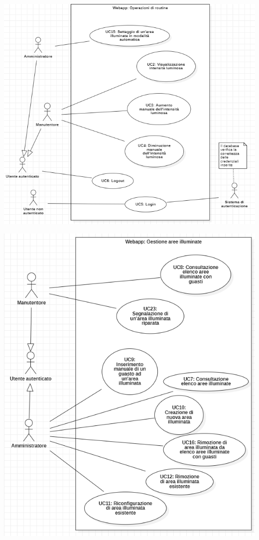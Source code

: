 \documentclass[a4paper, 12pt]{article}
\begin{document}
\includegraphics[scale=0.7]{diagramma_use_case_2.png}

\includegraphics[scale=0.7]{diagramma_use_case_3.png}
\end{document}
